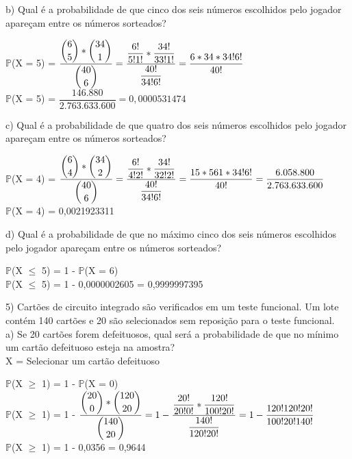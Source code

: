 \documentclass[12pt,a4paper,draft]{article}
\begin{document}
	\vspace{1cm}
	b) Qual é a probabilidade de que cinco dos seis números escolhidos pelo jogador apareçam entre os números sorteados?
	\begin{center}
		\vspace{0.5cm}
		$\mathbb{P}$(X = 5) = $\dfrac{\dbinom{6}{5} * \dbinom{34}{1}}{\dbinom{40}{6}} = \dfrac{\dfrac{6!}{5!1!} * \dfrac{34!}{33!1!}}{\dfrac{40!}{34! 6!}} = \dfrac{6 * 34 * 34!6!}{40!}$
		\vspace{0.5cm}\\
		$\mathbb{P}$(X = 5) = $\dfrac{146.880}{2.763.633.600} = 0,0000531474$
	\end{center}
	\vspace{1cm}
	c) Qual é a probabilidade de que quatro dos seis números escolhidos pelo jogador apareçam entre os números sorteados?
	\begin{center}
		\vspace{0.5cm}
		$\mathbb{P}$(X = 4) = $\dfrac{\dbinom{6}{4} * \dbinom{34}{2}}{\dbinom{40}{6}} = \dfrac{\dfrac{6!}{4!2!} * \dfrac{34!}{32!2!}}{\dfrac{40!}{34! 6!}} = \dfrac{15 * 561 * 34!6!}{40!} = \dfrac{6.058.800}{2.763.633.600}$\\ 
		\vspace{0.5cm}
		$\mathbb{P}$(X = 4) = 0,0021923311
	\end{center}
	\vspace{1cm}
	d) Qual é a probabilidade de que no máximo cinco dos seis números escolhidos pelo jogador apareçam entre os números sorteados?
	\begin{center}
		\vspace{0.5cm}
		$\mathbb{P}$(X $\leq$ 5) = 1 - $\mathbb{P}$(X = 6)
		\vspace{0.5cm}\\
		$\mathbb{P}$(X $\leq$ 5) = 1 - 0,0000002605 = 0,9999997395
\end{center}
	\vspace{1cm}
	5) Cartões de circuito integrado são verificados em um teste funcional. Um lote contém 140 cartões e 20 são selecionados sem reposição para o teste funcional.\\
	a) Se 20 cartões forem defeituosos, qual será a probabilidade de que no mínimo um cartão defeituoso esteja na amostra?
	\vspace{0.5cm}\\
	X = Selecionar um cartão defeituoso
	\begin{center}
		\vspace{0.5cm}
		$\mathbb{P}$(X $\geq$ 1) = 1 - $\mathbb{P}$(X = 0)
		\vspace{0.5cm}\\
		$\mathbb{P}$(X $\geq$ 1) = 1 - $\dfrac{\dbinom{20}{0} * \dbinom{120}{20}}{\dbinom{140}{20}} = 1 - \dfrac{\dfrac{20!}{20!0!} * \dfrac{120!}{100!20!}}{\dfrac{140!}{120!20!}} = 1 - \dfrac{120!120!20!}{100!20!140!}$
		\vspace{0.5cm}\\
		$\mathbb{P}$(X $\geq$ 1) = 1 - 0,0356 = 0,9644
	\end{center}
\end{document}
